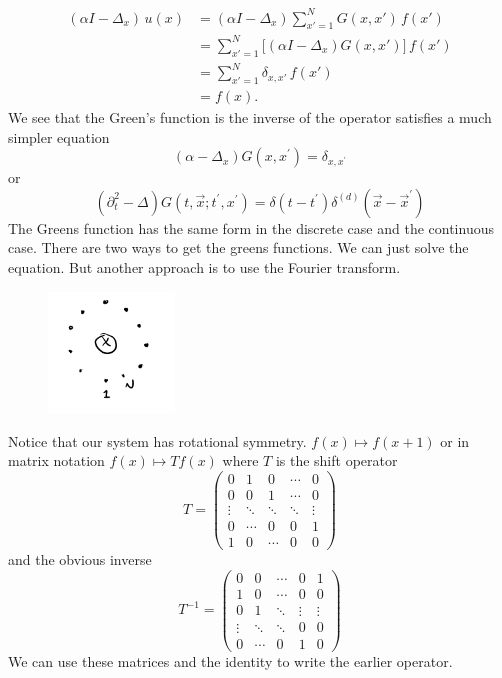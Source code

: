 \documentclass[11pt,a4paper]{article}
\begin{document}
\begin{align*}
	(\alpha I - \Delta_x)\,u(x)
	&= (\alpha I - \Delta_x)\sum_{x'=1}^N G(x,x')\,f(x') \\
	&= \sum_{x'=1}^N \bigl[(\alpha I - \Delta_x)G(x,x')\bigr]\,f(x') \\
	&= \sum_{x'=1}^N \delta_{x,x'}\,f(x') \\
	&= f(x).
\end{align*}
We see that the Green's function is the inverse of the operator satisfies a much simpler equation 
$$
(\alpha - \Delta_{x})G(x,x^{\prime})=\delta_{x,x^{\prime}}
$$
or 
$$
(\partial_{t}^{2}-\Delta)G(t,\vec{x};t^{\prime},x^{\prime}) = \delta(t-t^{\prime})\delta^{(d)}(\vec{x}-\vec{x}^{\prime})
$$
The Greens function has the same form in the discrete case and the continuous case.
There are two ways to get the greens functions. We can just solve the equation. But another approach is to use the Fourier transform.
\begin{figure}[H]
	\centering
	\includegraphics[width=0.3\textwidth]{FT1.png} %
\end{figure}
Notice that our system has rotational symmetry. $f(x)\mapsto f(x+1)$ or in matrix notation $f(x)\mapsto Tf(x)$ where $T$ is the shift operator
\[
T=
\begin{pmatrix}
	0 & 1 & 0 & \cdots & 0 \\
	0 & 0 & 1 & \cdots & 0 \\
	\vdots & \ddots & \ddots & \ddots & \vdots \\
	0 & \cdots & 0 & 0 & 1 \\
	1 & 0 & \cdots & 0 & 0
\end{pmatrix}
\]
and the obvious inverse
 \[
T^{-1} =
\begin{pmatrix}
	0 & 0 & \cdots & 0 & 1 \\
	1 & 0 & \cdots & 0 & 0 \\
	0 & 1 & \ddots & \vdots & \vdots \\
	\vdots & \ddots & \ddots & 0 & 0 \\
	0 & \cdots & 0 & 1 & 0
\end{pmatrix}
\]
We can use these matrices and the identity to write the earlier operator.
\end{document}
